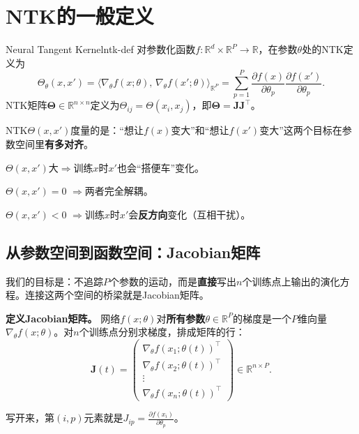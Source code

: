 \documentclass[11pt,a4paper]{article}
\newcommand{\R}{\mathbb{R}}
\newcommand{\bTheta}{\boldsymbol{\Theta}}
\newcommand{\bJ}{\mathbf{J}}
\begin{document}
\section{NTK的一般定义}

\begin{definition}{Neural Tangent Kernel}{ntk-def}
对参数化函数$f:\R^d\times\R^P\to\R$，在参数$\theta$处的NTK定义为
\[
\Theta_\theta(x,x') = \langle \nabla_\theta f(x;\theta),\, \nabla_\theta f(x';\theta)\rangle_{\R^P} = \sum_{p=1}^{P} \frac{\partial f(x)}{\partial \theta_p}\frac{\partial f(x')}{\partial \theta_p}.
\]
NTK矩阵$\bTheta\in\R^{n\times n}$定义为$\Theta_{ij}=\Theta(x_i,x_j)$，即$\bTheta=\bJ\bJ^\top$。
\end{definition}

\begin{keyinsight}
NTK$\Theta(x,x')$度量的是：``想让$f(x)$变大''和``想让$f(x')$变大''这两个目标在参数空间里\textbf{有多对齐}。

$\Theta(x,x')$大$\Rightarrow$训练$x$时$x'$也会``搭便车''变化。

$\Theta(x,x')=0$ $\Rightarrow$两者完全解耦。

$\Theta(x,x')<0$ $\Rightarrow$训练$x$时$x'$会\textbf{反方向}变化（互相干扰）。
\end{keyinsight}

\subsection{从参数空间到函数空间：Jacobian矩阵}

我们的目标是：不追踪$P$个参数的运动，而是\textbf{直接}写出$n$个训练点上输出的演化方程。连接这两个空间的桥梁就是Jacobian矩阵。

\textbf{定义Jacobian矩阵。} 网络$f(x;\theta)$对\textbf{所有参数}$\theta\in\R^P$的梯度是一个$P$维向量$\nabla_\theta f(x;\theta)$。对$n$个训练点分别求梯度，排成矩阵的行：
\[
\bJ(t) = \begin{pmatrix}
\nabla_\theta f(x_1;\theta(t))^\top \\
\nabla_\theta f(x_2;\theta(t))^\top \\
\vdots \\
\nabla_\theta f(x_n;\theta(t))^\top
\end{pmatrix} \in \R^{n\times P}.
\]

写开来，第$(i,p)$元素就是$J_{ip} = \frac{\partial f(x_i)}{\partial\theta_p}$。
\end{document}
